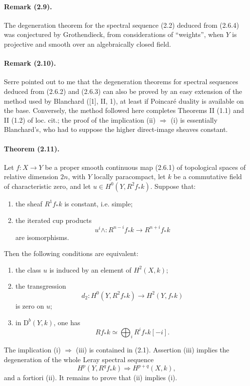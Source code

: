 \documentclass[10pt]{article}
\providecommand{\D}{\mathrm D}
\begin{document}
\paragraph{Remark (2.9).} The degeneration theorem for the spectral sequence (2.2) deduced from (2.6.4) was conjectured by Grothendieck, from considerations of ``weights'', when $Y$ is projective and smooth over an algebraically closed field.

\paragraph{Remark (2.10).} Serre pointed out to me that the degeneration theorems for spectral sequences deduced from (2.6.2) and (2.6.3) can also be proved by an easy extension of the method used by Blanchard ([1], II, 1), at least if Poincaré duality is available on the base. Conversely, the method followed here completes Theorems II (1.1) and II (1.2) of loc. cit.; the proof of the implication (ii) $\Rightarrow$ (i) is essentially Blanchard's, who had to suppose the higher direct-image sheaves constant.

\paragraph{Theorem (2.11).} Let $f:X\to Y$ be a proper smooth continuous map (2.6.1) of topological spaces of relative dimension $2n$, with $Y$ locally paracompact, let $k$ be a commutative field of characteristic zero, and let $u\in H^0(Y,R^2f_*k)$. Suppose that:
\begin{enumerate}[label=\alph*)]
\item the sheaf $R^1f_*k$ is constant, i.e. simple;
\item the iterated cup products
\[
 u^i\wedge:R^{n-i}f_*k\longrightarrow R^{n+i}f_*k
\]
are isomorphisms.
\end{enumerate}
Then the following conditions are equivalent:
\begin{enumerate}[label=(\roman*)]
\item the class $u$ is induced by an element of $H^2(X,k)$;
\item the transgression
\[
d_2:H^0(Y,R^2f_*k)\longrightarrow H^2(Y,f_*k)
\]
is zero on $u$;
\item in $\D^b(Y,k)$, one has
\[
Rf_*k\simeq\bigoplus_iR^if_*k[-i].
\]
\end{enumerate}
The implication (i) $\Rightarrow$ (iii) is contained in (2.1). Assertion (iii) implies the degeneration of the whole Leray spectral sequence
\[
\tag{2.12}
H^p(Y,R^qf_*k)\Longrightarrow H^{p+q}(X,k),
\]
and a fortiori (ii). It remains to prove that (ii) implies (i).
\end{document}
